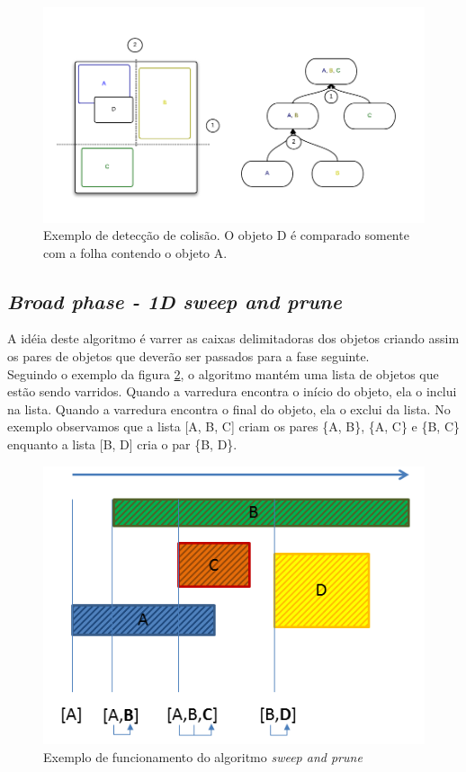 \begin{figure}[H]
  \includegraphics[scale=0.4]{AABBTree1.png}
  \caption{Exemplo de detecção de colisão. O objeto D é comparado somente com a folha contendo o objeto A.}
  \label{aabbTree}
\end{figure}

\subsection{\textit{Broad phase - 1D sweep and prune}}

A idéia deste algoritmo é varrer as caixas delimitadoras dos objetos criando assim os pares de objetos que deverão ser passados para a fase seguinte. \\

Seguindo o exemplo da figura \ref{sweep}, o algoritmo mantém uma lista de objetos que estão sendo varridos. Quando a varredura encontra o início do objeto, ela o inclui na lista. 
Quando a varredura encontra o final do objeto, ela o exclui da lista. No exemplo observamos que a lista [A, B, C] criam os pares \{A, B\}, \{A, C\} e \{B, C\} 
enquanto a lista [B, D] cria o par \{B, D\}. \\

\begin{figure}[!htbp]
  \centering
  \includegraphics[scale=0.7]{sp.png}
  \caption{Exemplo de funcionamento do algoritmo \textit{sweep and prune} \protect\cite{broad:sweep}}
  \label{sweep}
\end{figure}

